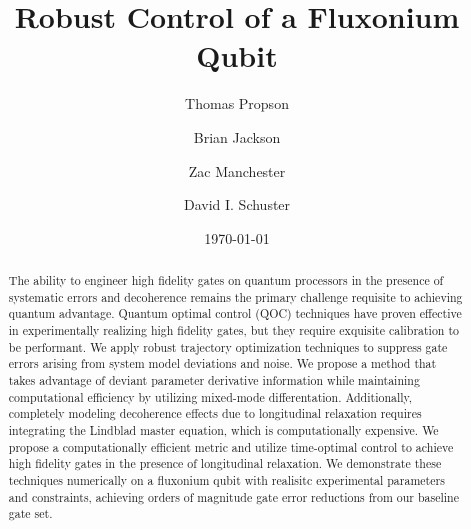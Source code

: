 \documentclass[
  amsfonts,
  amsmath,
  tbtags,
  amssymb,
  aps,
  nobibnotes,
  twocolumn,
  superscriptaddress,
]{revtex4-2}
\begin{document}
\title{Robust Control of a Fluxonium Qubit}

\author{Thomas Propson}
\author{Brian Jackson}
\author{Zac Manchester}
\author{David I. Schuster}

\date{\today}


\begin{abstract}
  The ability to engineer high fidelity gates on quantum processors in the presence of
  systematic errors and decoherence remains the primary challenge requisite to achieving quantum advantage.
  Quantum optimal control (QOC) techniques have proven effective in experimentally
  realizing high fidelity gates, but they require exquisite calibration to be performant.
  We apply robust trajectory optimization techniques to suppress gate errors arising from system
  model deviations and noise.
  We propose a method that takes advantage of deviant parameter derivative information while maintaining
  computational efficiency by utilizing mixed-mode differentation.
  Additionally, completely modeling decoherence effects due to longitudinal relaxation requires
  integrating the Lindblad master equation, which is computationally expensive.
  We propose a computationally efficient metric
  and utilize time-optimal control to achieve high fidelity gates in the presence of longitudinal relaxation.
  We demonstrate these techniques numerically on a fluxonium qubit with realisitc experimental parameters and constraints,
  achieving orders of magnitude gate error reductions from our baseline gate set.
\end{abstract}

\maketitle
\end{document}

